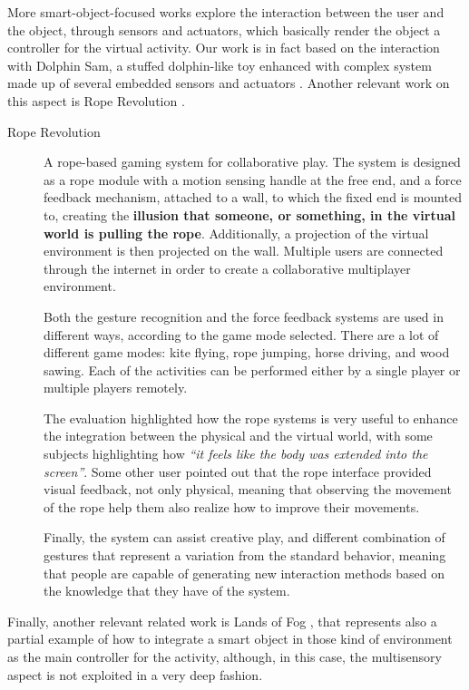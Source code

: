 \noindent More smart-object-focused works explore the interaction between the user and the object, through sensors and actuators, which basically render the object a controller for the virtual activity. Our work is in fact based on the interaction with  Dolphin Sam, a stuffed dolphin-like toy enhanced with complex system made up of several embedded sensors and actuators \cite{colombo_dolphin_2016}.  Another relevant work on this aspect is Rope Revolution \cite{yao_rope_2011}.

\begin{description}
	\item[Rope Revolution]  A rope-based gaming system for collaborative play.
	The system is designed as a rope module with a motion sensing handle at the free end, and a force feedback mechanism, attached to a wall, to which the fixed end is mounted to, creating the \textbf{illusion that someone, or something, in the virtual world is pulling the rope}.
	Additionally, a projection of the virtual environment is then projected on the wall. Multiple users are connected through the internet in order to create a collaborative multiplayer environment.
	
	Both the gesture recognition and the force feedback systems are used in different ways, according to the game mode selected.
	There are a lot of different game modes: kite flying, rope jumping, horse driving, and wood sawing. Each of the activities can be performed either by a single player or multiple players remotely.
	
	The evaluation highlighted how the rope systems is very useful to enhance the integration between the physical and the virtual world, with some subjects highlighting how \textit{``it feels like the body was extended into the screen''}.
	Some other user pointed out that the rope interface provided visual feedback, not only physical, meaning that observing the movement of the rope help them also realize how to improve their movements.
	
	Finally, the system can assist creative play, and different combination of gestures that represent a variation from the standard behavior,  meaning that people are capable of generating new interaction methods based on the knowledge that they have of the system.
\end{description}

\noindent Finally, another relevant related work is Lands of Fog \cite{mora-guiard_lands_2016}, that represents also a partial example of how to integrate a smart object in those kind of environment as the main controller for the activity, although, in this case, the multisensory aspect is not exploited in a very deep fashion.

